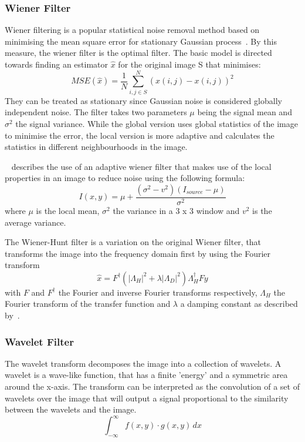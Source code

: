\documentclass[a4paper, 12pt]{report}
\begin{document}
\subsubsection{Wiener Filter}
Wiener filtering is a popular statistical noise removal method based on minimising the mean square error for stationary Gaussian process~\cite{jin2003adaptive}. By this measure, the wiener filter is the optimal filter.
The basic model is directed towards finding an estimator \(\hat{x}\) for the original image S that minimises:
\[MSE(\hat{x})=\frac{1}{N} \sum_{i,j\in S}^{N}(\hat{x}(i,j)-x(i,j))^2\]
They can be treated as stationary since Gaussian noise is considered globally independent noise. The filter takes two parameters \(\mu\) being the signal mean and \(\sigma^2\) the signal variance. While the global version uses global statistics of the image to minimise the error, the local version is more adaptive and calculates the statistics in different neighbourhoods in the image.
\par

~\cite{gatos2006adaptive} describes the use of an adaptive wiener filter that makes use of the local properties in an image to reduce noise using the following formula:
\[I(x,y)=\mu+\frac{(\sigma^2-v^2)(I_{source}-\mu)}{\sigma^2}\]
where \(\mu\) is the local mean, \(\sigma^2\) the variance in a 3 x 3 window and \(v^2\) is the average variance.
\par
The Wiener-Hunt filter is a variation on the original Wiener filter, that transforms the image into the frequency domain first by using the Fourier transform
\[\hat x = F^\dagger (|\Lambda_H|^2 + \lambda |\Lambda_D|^2)
    \Lambda_H^\dagger F y\]
with \(F\) and \(F^\dagger\) the Fourier and inverse Fourier transforms respectively, \(\Lambda_H\) the Fourier transform of the transfer function and \(\lambda\) a damping constant as described by~\cite{scikit-image}.

\subsubsection{Wavelet Filter}
The wavelet transform decomposes the image into a collection of wavelets. A wavelet is a wave-like function, that has a finite 'energy' and a symmetric area around the x-axis. The transform can be interpreted as the convolution of a set of wavelets over the image that will output a signal proportional to the similarity between the wavelets and the image.
\[ \int_{-\infty}^{\infty} f(x,y) \cdot g(x,y) \,dx \]
\end{document}
